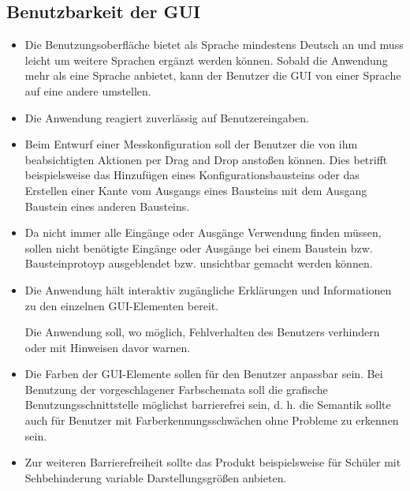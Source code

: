 \documentclass[parskip=full]{scrartcl}
\begin{document}
\subsection {Benutzbarkeit der GUI}
\begin{itemize}
	
	\item 
	\begin{WunschKrit} 		
		Die Benutzungsoberfläche bietet als Sprache mindestens Deutsch an und muss leicht um weitere Sprachen ergänzt werden können. Sobald die Anwendung mehr als eine Sprache anbietet, kann der Benutzer die GUI von einer Sprache auf eine andere umstellen.	
	\end{WunschKrit}
	\item 
	\begin{SollKrit}
		Die Anwendung reagiert zuverlässig auf Benutzereingaben.
	\end{SollKrit}
	\item 
	\begin{SollKrit} 
		Beim Entwurf einer Messkonfiguration soll der Benutzer die von ihm beabsichtigten Aktionen per Drag and Drop anstoßen können. Dies betrifft beispielsweise das Hinzufügen eines Konfigurationsbausteins oder das Erstellen einer Kante vom Ausgangs eines Bausteins mit dem Ausgang Baustein eines anderen Bausteins.
	\end{SollKrit}
	\item 
	\begin{WunschKrit}
		Da nicht immer alle Eingänge oder Ausgänge Verwendung finden müssen, sollen nicht benötigte Eingänge oder Ausgänge bei einem Baustein bzw. Bausteinprotoyp ausgeblendet bzw. unsichtbar gemacht werden können. 
	\end{WunschKrit}
	\item 
	\begin{SollKrit}
		Die Anwendung hält interaktiv zugängliche Erklärungen und Informationen zu den einzelnen GUI-Elementen bereit.
	\end{SollKrit}
	\begin{SollKrit}
		Die Anwendung soll, wo möglich, Fehlverhalten des Benutzers verhindern oder mit Hinweisen davor warnen. 
	\end{SollKrit}
	\item 
	\begin{WunschKrit} 
		Die Farben der GUI-Elemente sollen für den Benutzer anpassbar sein. Bei Benutzung der vorgeschlagener Farbschemata soll die grafische Benutzungsschnittstelle möglichst barrierefrei sein, d. h. die Semantik sollte auch für Benutzer mit Farberkennungsschwächen ohne Probleme zu erkennen sein.
	\end{WunschKrit} 
	
	\item 
	\begin{WunschKrit} 
		Zur weiteren Barrierefreiheit sollte das Produkt beispielsweise für Schüler mit Sehbehinderung variable Darstellungsgrößen anbieten.
	\end{WunschKrit}
	
	
\end{itemize}
\end{document}
